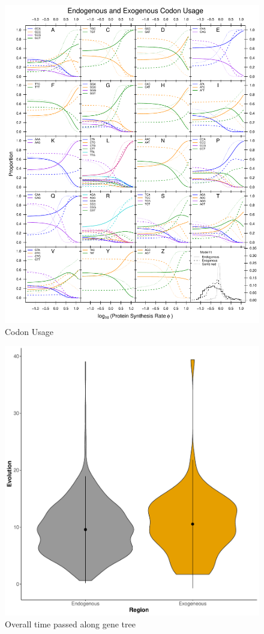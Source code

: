 \documentclass[12pt]{article}
\begin{document}
\begin{figure}[H]
     \centering
	\includegraphics[width=\textwidth]{img/CUB_cleft_main.pdf}
	\caption{Codon Usage}
	\label{fig:cub_all_aa}
\end{figure}

\begin{figure}[H]
     \centering
	\includegraphics[width=\textwidth]{img/rate_of_evolution.pdf}
	\caption{Overall time passed along gene tree}
	\label{fig:rate_evol}
\end{figure}
\end{document}
